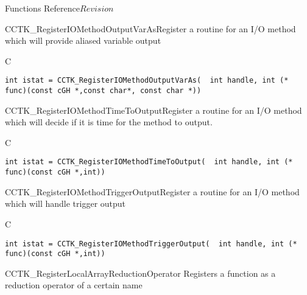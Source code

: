 \begin{cactuspart}{ Functions Reference}{}{$Revision$}
\begin{FunctionDescription}{CCTK\_RegisterIOMethodOutputVarAs}{Register a routine for an I/O method which will provide aliased variable output}
\label{CCTK-RegisterIOMethodOutputVarAs}
\begin{SynopsisSection}
\begin{Synopsis}{C}
\begin{verbatim}int istat = CCTK_RegisterIOMethodOutputVarAs(  int handle, int (* func)(const cGH *,const char*, const char *))\end{verbatim}
\end{Synopsis}
\end{SynopsisSection}
\end{FunctionDescription}


\begin{FunctionDescription}{CCTK\_RegisterIOMethodTimeToOutput}{Register a routine for an I/O method which will decide if it is time for the method to output.}
\label{CCTK-RegisterIOMethodTimeToOutput}
\begin{SynopsisSection}
\begin{Synopsis}{C}
\begin{verbatim}int istat = CCTK_RegisterIOMethodTimeToOutput(  int handle, int (* func)(const cGH *,int))\end{verbatim}
\end{Synopsis}
\end{SynopsisSection}
\end{FunctionDescription}

\begin{FunctionDescription}{CCTK\_RegisterIOMethodTriggerOutput}{Register a routine for an I/O method which will handle trigger output}
\label{CCTK-RegisterIOMethodTriggerOutput}
\begin{SynopsisSection}
\begin{Synopsis}{C}
\begin{verbatim}int istat = CCTK_RegisterIOMethodTriggerOutput(  int handle, int (* func)(const cGH *,int))\end{verbatim}
\end{Synopsis}
\end{SynopsisSection}
\end{FunctionDescription}

\begin{FunctionDescription}{CCTK\_RegisterLocalArrayReductionOperator}
\label{CCTK-RegisterLocalArrayReductionOperator}
Registers a function as a reduction operator of a certain name


\end{FunctionDescription}
\end{cactuspart}

